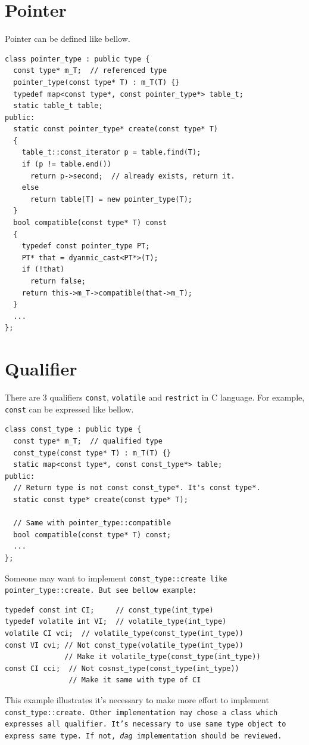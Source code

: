 \section{Pointer}
\label{type_e003}
Pointer can be defined like bellow.
\begin{verbatim}
class pointer_type : public type {
  const type* m_T;  // referenced type
  pointer_type(const type* T) : m_T(T) {}
  typedef map<const type*, const pointer_type*> table_t;
  static table_t table;
public:
  static const pointer_type* create(const type* T)
  {
    table_t::const_iterator p = table.find(T);
    if (p != table.end())
      return p->second;  // already exists, return it.
    else
      return table[T] = new pointer_type(T);
  }
  bool compatible(const type* T) const
  {
    typedef const pointer_type PT;
    PT* that = dyanmic_cast<PT*>(T);
    if (!that)
      return false;
    return this->m_T->compatible(that->m_T);
  }
  ...
};
\end{verbatim}

\section{Qualifier}
\label{type_e002}
There are 3 qualifiers {\tt{const}}, {\tt{volatile}} and {\tt{restrict}}
in C language.
For example, {\tt{const}} can be expressed like bellow.
\begin{verbatim}
class const_type : public type {
  const type* m_T;  // qualified type
  const_type(const type* T) : m_T(T) {}
  static map<const type*, const const_type*> table;
public:
  // Return type is not const const_type*. It's const type*.
  static const type* create(const type* T);

  // Same with pointer_type::compatible
  bool compatible(const type* T) const;
  ...
};
\end{verbatim}
Someone may want to implement \tt{const\_type::create}
like {\tt{pointer\_type::create}}. But see bellow example:
\begin{verbatim}
typedef const int CI;     // const_type(int_type)
typedef volatile int VI;  // volatile_type(int_type)
volatile CI vci;  // volatile_type(const_type(int_type))
const VI cvi; // Not const_type(volatile_type(int_type))
              // Make it volatile_type(const_type(int_type))
const CI cci;  // Not cosnst_type(const_type(int_type))
               // Make it same with type of CI
\end{verbatim}
This example illustrates it's necessary to make more effort
to implement \tt{const\_type::create}. Other implementation
may chose a class which expresses all qualifier. It's necessary
to use same type object to express same type. If not,
{\it dag} implementation should be reviewed.

